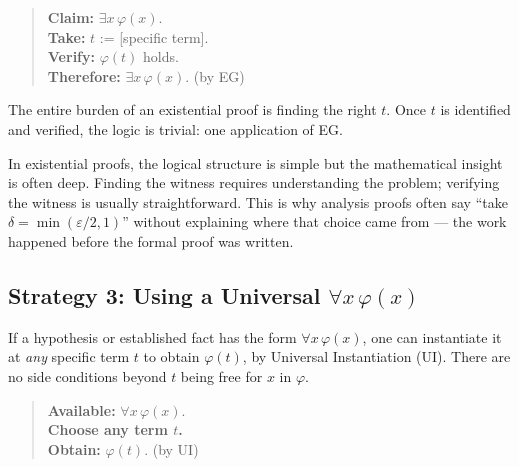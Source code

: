 \begin{quote}
\textbf{Claim:} $\exists x\,\varphi(x)$.\\
\textbf{Take:} $t$ := [specific term].\\
\textbf{Verify:} $\varphi(t)$ holds. \\
\textbf{Therefore:} $\exists x\,\varphi(x)$. \quad (by EG)
\end{quote}

\begin{exposition}
The entire burden of an existential proof is finding the right $t$. Once $t$
is identified and verified, the logic is trivial: one application of EG.
\end{exposition}

\begin{remark*}
In existential proofs, the logical structure is simple but the mathematical
insight is often deep. Finding the witness requires understanding the problem;
verifying the witness is usually straightforward. This is why analysis proofs
often say ``take $\delta = \min(\varepsilon/2, 1)$'' without explaining where
that choice came from --- the work happened before the formal proof was written.
\end{remark*}


\subsection*{\texorpdfstring{Strategy 3: Using a Universal $\forall x\,\varphi(x)$}{Strategy 3: Using a Universal forall x phi(x)}}

\begin{exposition}
If a hypothesis or established fact has the form $\forall x\,\varphi(x)$, one
can instantiate it at \emph{any} specific term $t$ to obtain $\varphi(t)$, by
Universal Instantiation (UI). There are no side conditions beyond $t$ being
free for $x$ in $\varphi$.
\end{exposition}

\begin{quote}
\textbf{Available:} $\forall x\,\varphi(x)$.\\
\textbf{Choose any term $t$.}\\
\textbf{Obtain:} $\varphi(t)$. \quad (by UI)
\end{quote}


